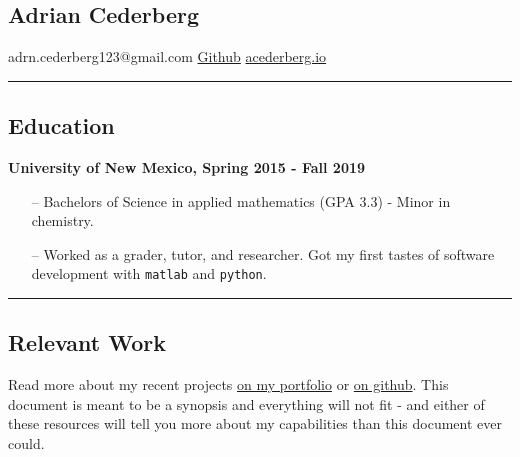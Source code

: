 \documentclass{article}
\begin{document}
\newcommand{\chapsubhead}[1]{{ \begin{center}\Large #1 \vspace{2ex} \end{center} }}
\providecommand{\tightlist}{%
  \setlength{\itemsep}{0pt}\setlength{\parskip}{0pt}}


\begin{center}
    \section*{Adrian Cederberg}
\end{center}

\chapsubhead{
    adrn.cederberg123@gmail.com
    \textbar{} \href{https://github.com/acederberg}{Github} \textbar{}
    \href{https://acederberg.io}{acederberg.io}
}

\rule{\textwidth}{0.1pt}
\begin{center}
\section*{Education}\label{education}
\end{center}
\textbf{University of New Mexico, Spring 2015 - Fall 2019}
\begin{itemize}
\tightlist
\item[--]
  Bachelors of Science in applied mathematics (GPA 3.3) - Minor in chemistry.
\item[--]
  Worked as a grader, tutor, and researcher. Got my first tastes of software development with \texttt{matlab} and \texttt{python}.
\end{itemize}

\rule{\textwidth}{0.1pt}
\begin{center}
    \section*{Relevant Work}\label{relevant-work}
\end{center}

Read more about my recent projects \href{https://acederberg.io/home}{on my portfolio} or \href{https://github.com/acederberg}{on github}. This document is meant to be a synopsis and everything will not fit - and either of these resources will tell you more about my capabilities than this document ever could.
\end{document}
